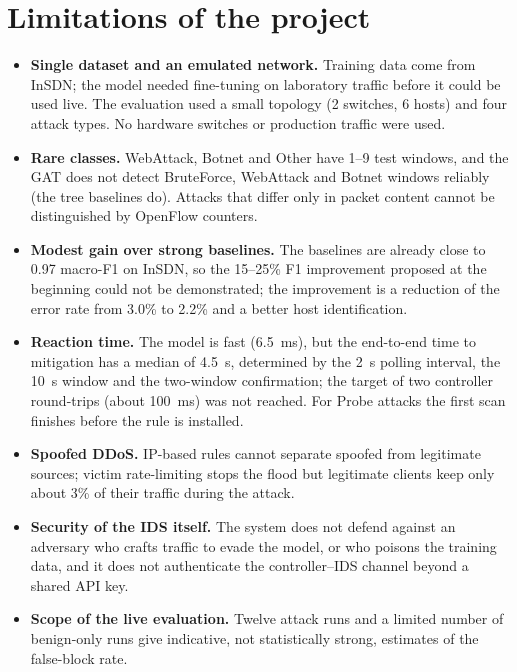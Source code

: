 \section{Limitations of the project}
\begin{itemize}
	\item \textbf{Single dataset and an emulated network.} Training data come from InSDN; the model needed fine-tuning on laboratory traffic before it could be used live. The evaluation used a small topology (2 switches, 6 hosts) and four attack types. No hardware switches or production traffic were used.
	\item \textbf{Rare classes.} WebAttack, Botnet and Other have 1--9 test windows, and the GAT does not detect BruteForce, WebAttack and Botnet windows reliably (the tree baselines do). Attacks that differ only in packet content cannot be distinguished by OpenFlow counters.
	\item \textbf{Modest gain over strong baselines.} The baselines are already close to 0.97 macro-F1 on InSDN, so the 15--25\% F1 improvement proposed at the beginning could not be demonstrated; the improvement is a reduction of the error rate from 3.0\% to 2.2\% and a better host identification.
	\item \textbf{Reaction time.} The model is fast (6.5~ms), but the end-to-end time to mitigation has a median of 4.5~s, determined by the 2~s polling interval, the 10~s window and the two-window confirmation; the target of two controller round-trips (about 100~ms) was not reached. For Probe attacks the first scan finishes before the rule is installed.
	\item \textbf{Spoofed DDoS.} IP-based rules cannot separate spoofed from legitimate sources; victim rate-limiting stops the flood but legitimate clients keep only about 3\% of their traffic during the attack.
	\item \textbf{Security of the IDS itself.} The system does not defend against an adversary who crafts traffic to evade the model, or who poisons the training data, and it does not authenticate the controller--IDS channel beyond a shared API key.
	\item \textbf{Scope of the live evaluation.} Twelve attack runs and a limited number of benign-only runs give indicative, not statistically strong, estimates of the false-block rate.
\end{itemize}

